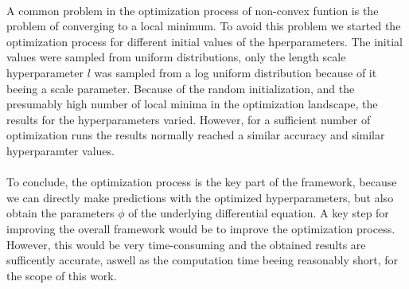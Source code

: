 \documentclass{article}
\begin{document}
\\
A common problem in the optimization process of non-convex funtion is the problem of converging to a local minimum. To avoid this problem we started the optimization process for different initial values of the hperparameters. The initial values were sampled from uniform distributions, only the length scale hyperparameter $l$ was sampled from a log uniform distribution because of it beeing a scale parameter. Because of the random initialization, and the presumably high number of local minima in the optimization landscape, the results for the hyperparameters varied. However, for a sufficient number of optimization runs the results normally reached a similar accuracy and similar hyperparamter values.\\
\\
To conclude, the optimization process is the key part of the framework, because we can directly make predictions with the optimized hyperparameters, but also obtain the parameters $\phi$ of the underlying differential equation. A key step for improving the overall framework would be to improve the optimization process. However, this would be very time-consuming and the obtained results are sufficently accurate, aswell as the computation time beeing reasonably short, for the scope of this work.\\
\end{document}
